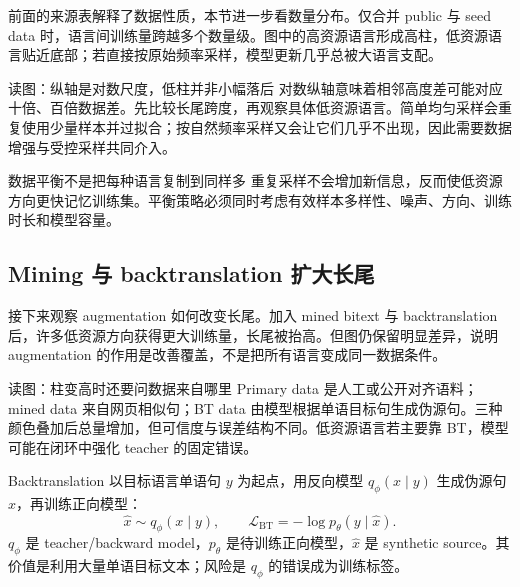 前面的来源表解释了数据性质，本节进一步看数量分布。仅合并 public 与 seed data 时，语言间训练量跨越多个数量级。图中的高资源语言形成高柱，低资源语言贴近底部；若直接按原始频率采样，模型更新几乎总被大语言支配。


\begin{knowledgebox}{读图：纵轴是对数尺度，低柱并非小幅落后}
对数纵轴意味着相邻高度差可能对应十倍、百倍数据差。先比较长尾跨度，再观察具体低资源语言。简单均匀采样会重复使用少量样本并过拟合；按自然频率采样又会让它们几乎不出现，因此需要数据增强与受控采样共同介入。
\end{knowledgebox}

\begin{warningbox}{数据平衡不是把每种语言复制到同样多}
重复采样不会增加新信息，反而使低资源方向更快记忆训练集。平衡策略必须同时考虑有效样本多样性、噪声、方向、训练时长和模型容量。
\end{warningbox}

\subsection{Mining 与 backtranslation 扩大长尾}

接下来观察 augmentation 如何改变长尾。加入 mined bitext 与 backtranslation 后，许多低资源方向获得更大训练量，长尾被抬高。但图仍保留明显差异，说明 augmentation 的作用是改善覆盖，不是把所有语言变成同一数据条件。


\begin{knowledgebox}{读图：柱变高时还要问数据来自哪里}
Primary data 是人工或公开对齐语料；mined data 来自网页相似句；BT data 由模型根据单语目标句生成伪源句。三种颜色叠加后总量增加，但可信度与误差结构不同。低资源语言若主要靠 BT，模型可能在闭环中强化 teacher 的固定错误。
\end{knowledgebox}

Backtranslation 以目标语言单语句 $y$ 为起点，用反向模型 $q_\phi(x\mid y)$ 生成伪源句 $\hat{x}$，再训练正向模型：
\[
\hat{x}\sim q_\phi(x\mid y),\qquad
\mathcal{L}_{\text{BT}}=-\log p_\theta(y\mid\hat{x}).
\]
$q_\phi$ 是 teacher/backward model，$p_\theta$ 是待训练正向模型，$\hat{x}$ 是 synthetic source。其价值是利用大量单语目标文本；风险是 $q_\phi$ 的错误成为训练标签。

